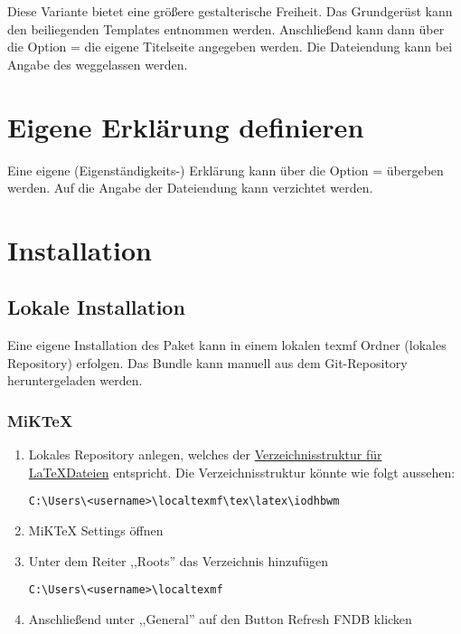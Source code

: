 \documentclass[babel=ngerman,highlight=false]{skdoc}
\let\oldblindtext\blindtext
\renewcommand{\blindtext}{{\color{gray}\oldblindtext}}
\begin{document}
            Diese Variante bietet eine größere gestalterische Freiheit. Das Grundgerüst kann den beiliegenden Templates entnommen werden. Anschließend kann dann über die Option  =  die eigene Titelseite angegeben werden. Die Dateiendung kann bei Angabe des  weggelassen werden.
            
        \section{Eigene Erklärung definieren}
            Eine eigene (Eigenständigkeits-) Erklärung kann über die Option  =  übergeben werden. Auf die Angabe der Dateiendung kann verzichtet werden.
            
            
    \section{Installation}
        \subsection{Lokale Installation}
            Eine eigene Installation des Paket kann in einem lokalen texmf Ordner (lokales Repository) erfolgen. Das Bundle kann manuell aus dem Git-Repository heruntergeladen werden.
            
            \subsubsection{MiKTeX}
                \begin{enumerate}
                    \item Lokales Repository anlegen, welches der \href{http://tug.ctan.org/tds/tds.html}{Verzeichnisstruktur für \LaTeX Dateien} entspricht. Die Verzeichnisstruktur könnte wie folgt aussehen:\par \verb|C:\Users\<username>\localtexmf\tex\latex\iodhbwm|
                    \item MiKTeX Settings öffnen
                    \item Unter dem Reiter ,,Roots'' das Verzeichnis hinzufügen\par \verb|C:\Users\<username>\localtexmf|
                    \item Anschließend unter ,,General'' auf den Button Refresh FNDB klicken
                \end{enumerate}
            
\end{document}
